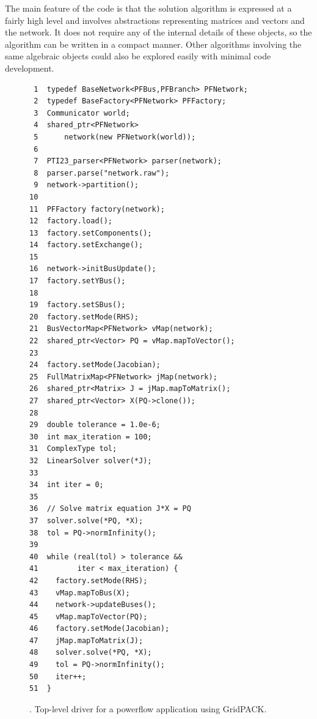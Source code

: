 \documentclass[preprint]{acm_proc_article-sp}
\begin{document}
The main feature of the code is that the solution algorithm is expressed at a
fairly high level and involves abstractions representing matrices and vectors
and the network. It does not require any of the internal details of these
objects, so the algorithm can be written in a compact manner. Other algorithms
involving the same algebraic objects could also be explored easily with minimal
code development.

\begin{figure}
\label{code}
\begin{verbatim}
 1  typedef BaseNetwork<PFBus,PFBranch> PFNetwork;
 2  typedef BaseFactory<PFNetwork> PFFactory;
 3  Communicator world;
 4  shared_ptr<PFNetwork>
 5      network(new PFNetwork(world));
 6
 7  PTI23_parser<PFNetwork> parser(network);
 8  parser.parse("network.raw");
 9  network->partition();
10
11  PFFactory factory(network);
12  factory.load();
13  factory.setComponents();
14  factory.setExchange();
15
16  network->initBusUpdate();
17  factory.setYBus();
18
19  factory.setSBus();
20  factory.setMode(RHS); 
21  BusVectorMap<PFNetwork> vMap(network);
22  shared_ptr<Vector> PQ = vMap.mapToVector();
23
24  factory.setMode(Jacobian);
25  FullMatrixMap<PFNetwork> jMap(network);
26  shared_ptr<Matrix> J = jMap.mapToMatrix();
27  shared_ptr<Vector> X(PQ->clone());
28
29  double tolerance = 1.0e-6;
30  int max_iteration = 100;
31  ComplexType tol;
32  LinearSolver solver(*J);
33
34  int iter = 0;
35
36  // Solve matrix equation J*X = PQ
37  solver.solve(*PQ, *X);
38  tol = PQ->normInfinity();
39
40  while (real(tol) > tolerance &&
41         iter < max_iteration) {
42    factory.setMode(RHS);
43    vMap.mapToBus(X);
44    network->updateBuses();
45    vMap.mapToVector(PQ);
46    factory.setMode(Jacobian);
47    jMap.mapToMatrix(J);
48    solver.solve(*PQ, *X);
49    tol = PQ->normInfinity();
50    iter++;
51  }
\end{verbatim}
\caption{\label{pf_app}. Top-level driver for a powerflow application using
GridPACK\texttrademark.}
\end{figure}
\end{document}
